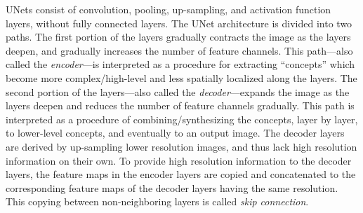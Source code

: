 \documentclass[10pt,a4paper]{article}
\begin{document}
UNets consist of convolution, pooling, up-sampling, and activation function layers, without fully connected layers.
%
The UNet architecture is divided into two paths. The first portion of the layers gradually contracts the image as the layers deepen, and gradually increases the number of feature channels. This path---also called the \emph{encoder}---is interpreted as a procedure for extracting ``concepts'' which become more complex/high-level and less spatially localized along the layers. The second portion of the layers---also called the \emph{decoder}---expands the image as the layers deepen and reduces the number of feature channels gradually. This path is interpreted as a procedure of combining/synthesizing the concepts, layer by layer, to lower-level concepts, and eventually to an output image. The decoder layers are derived by up-sampling lower resolution images, and thus lack high resolution information on their own. To provide high resolution information to the decoder layers, the feature maps  in the encoder layers are copied and concatenated to the corresponding feature maps of the decoder layers having the same resolution. This copying between non-neighboring layers is called \emph{skip connection}.  %

\end{document}
